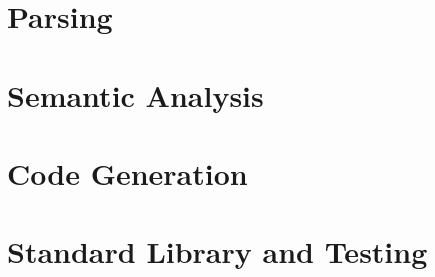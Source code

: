 \documentclass[11pt,a4paper,twoside,openright]{book}
\begin{document}
\part{Parsing}




\part{Semantic Analysis}










\part{Code Generation}



\part{Standard Library and Testing}



\backmatter
\appendix





\printindex
\end{document}
